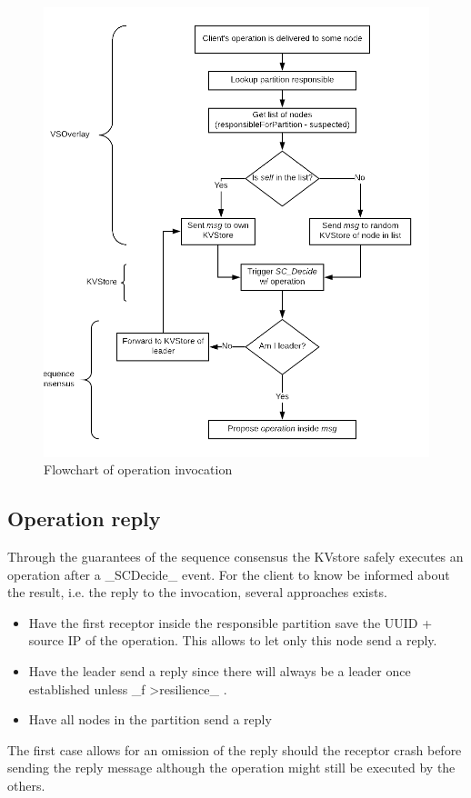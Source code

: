 \documentclass[a4paper]{scrartcl}
\begin{document}
\begin{figure}[h!]
  \begin{center}
    \includegraphics[scale=0.4]{OperationFlowInvocation.png}
    \caption{Flowchart of operation invocation}
    \label{fig:invocation}
  \end{center}
\end{figure}

\subsection{Operation  reply}
Through the guarantees of the sequence consensus the KVstore safely executes an operation after a _SCDecide_ event.
For the client to know be informed about the result, i.e. the reply to the invocation, several approaches exists.
\begin{itemize}
	\item Have the first receptor inside the responsible partition save the UUID + source IP of the operation. 
	This allows to let only this node send a reply.
	\item Have the leader send a reply since there will always be a leader once established unless _f \textgreater resilience_ .
	\item Have all nodes in the partition send a reply
\end{itemize}
The first case allows for an omission of the reply should the receptor crash before sending the reply message although the operation might still be executed by the others.
\end{document}
